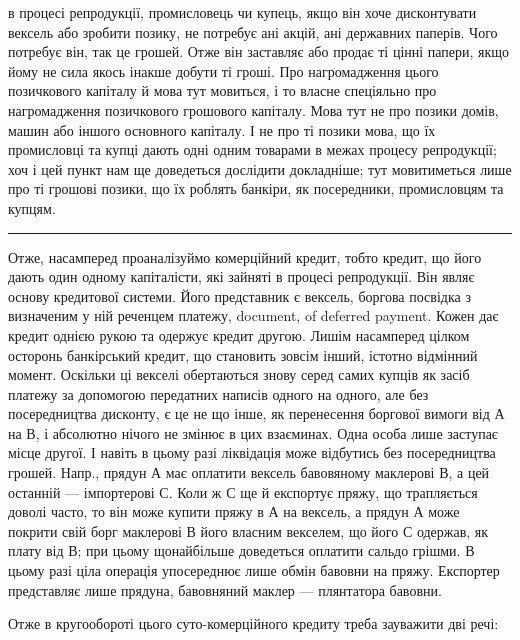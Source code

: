 \parcont{}  %
в процесі репродукції, промисловець чи купець, якщо він хоче дисконтувати
вексель або зробити позику, не потребує ані акцій, ані державних паперів. Чого
потребує він, так це грошей. Отже він заставляє або продає ті цінні папери, якщо
йому не сила якось інакше добути ті гроші. Про нагромадження цього позичкового
капіталу й мова тут мовиться, і то власне спеціяльно про нагромадження позичкового
грошового капіталу. Мова тут не про позики домів, машин або іншого
основного капіталу. І не про ті позики мова, що їх промисловці та купці дають
одні одним товарами в межах процесу репродукції; хоч і цей пункт нам ще
доведеться дослідити докладніше; тут мовитиметься лише про ті грошові позики,
що їх роблять банкіри, як посередники, промисловцям та купцям.

\pfbreak

Отже, насамперед проаналізуймо комерційний кредит, тобто кредит, що його
дають один одному капіталісти, які зайняті в процесі репродукції. Він являє
основу кредитової системи. Його представник є вексель, боргова посвідка з визначеним
у ній реченцем платежу, document, of deferred payment. Кожен дає кредит
однією рукою та одержує кредит другою. Лишім насамперед цілком осторонь банкірський
кредит, що становить зовсім інший, істотно відмінний момент. Оскільки ці
векселі обертаються знову серед самих купців як засіб платежу за допомогою
передатних написів одного на одного, але без посередництва дисконту, є це не
що інше, як перенесення боргової вимоги від А на В, і абсолютно нічого не
змінює в цих взаєминах. Одна особа лише заступає місце другої. І навіть
в цьому разі ліквідація може відбутись без посередництва грошей. Напр., прядун
А має оплатити вексель бавовяному маклерові В, а цей останній — імпортерові С.
Коли ж С ще й експортує пряжу, що трапляється доволі часто, то він може
купити пряжу в А на вексель, а прядун А може покрити свій борг маклерові В
його власним векселем, що його С одержав, як плату від В; при цьому щонайбільше
доведеться оплатити сальдо грішми. В цьому разі ціла операція
упосереднює лише обмін бавовни на пряжу. Експортер представляє лише прядуна,
бавовняний маклер — плянтатора бавовни.

Отже в кругообороті цього суто-комерційного кредиту треба зауважити дві речі:

